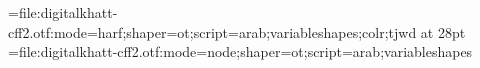 \edef\pdfcompresslevel{\pdfvariable compresslevel}
\edef\pdfobjcompresslevel{\pdfvariable objcompresslevel}
\newattribute{\tajweedatt}
\newattribute{\sajdaatt}



\newbox\ayaframe
\newcount\suranum


\def\suraline#1{%
\global\advance\suranum by1%
\raise40pt\hbox to 0pt{\pdfbookmark{\the\suranum. #1}{sura\the\suranum}}%
\hbox to 0pt{\copy\ayaframe\hss}\centerline{#1}%
}%
\def\bismline#1{\centerline{#1}}



\def\sajdabar#1{\setattribute{\sajdaatt}{1}#1\unsetattribute{\sajdaatt}\directlua{addsajdacallback()}%
}

\font\medinafontvar={file:digitalkhatt-cff2.otf:mode=harf;shaper=ot;script=arab;variableshapes;colr;tjwd} at 28pt
\font\medinafontvarnode={file:digitalkhatt-cff2.otf:mode=node;shaper=ot;script=arab;variableshapes}

\renewcommand{\baselinestretch}{5}
\parindent=0pt
\parfillskip=0pt

\def\topglue{\nointerlineskip \vglue-\topskip \vglue}